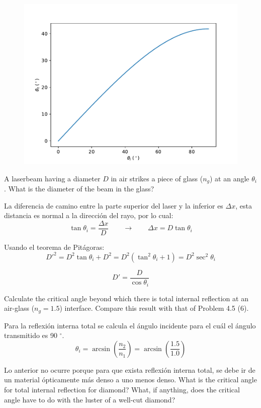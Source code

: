 \documentclass[addpoints,10pt]{exam}
\begin{document}
\begin{questions}
		\begin{figure}[h]
			\centering
			\includegraphics[width = 0.6\linewidth]{418.pdf}
		\end{figure}
		
		{	\question
			A laserbeam having a diameter $D$ in air strikes a piece of glass ($n_{g}$) at an angle $\theta_i$. What is the diameter of the beam in the glass?
		}
		
		La diferencia de camino entre la parte superior del laser y la inferior es $\Delta x$, esta distancia es normal a la direcci\'on del rayo, por lo cual:
		\begin{equation}
			\tan\theta_i = \dfrac{\Delta x}{D} \qquad \longrightarrow \qquad \Delta x = D\tan\theta_i
		\end{equation}
		
		Usando el teorema de Pit\'agoras:
		\begin{equation}
			D'^2 = D^2\tan\theta_i + D^2 = D^2\left(\tan^2\theta_i + 1\right) = D^2\sec^2\theta_i
		\end{equation}
		
		\begin{equation}
			D' = \dfrac{D}{\cos\theta_i}
		\end{equation}
		
		{
			\question
			Calculate the critical angle beyond which there is total internal reflection at an air-glass ($n_g = 1.5$) interface. Compare this result with that of Problem 4.5 (6).
		}
		
		Para la reflexi\'on interna total se calcula el \'angulo incidente para el cu\'al el \'angulo transmitido es 90 $^\circ$.
		\begin{equation}
			\theta_i =  \arcsin\left(\dfrac{n_2}{n_1}\right) = \arcsin\left(\dfrac{1.5}{1.0}\right)
		\end{equation}
		
		Lo anterior no ocurre porque para que exista reflexi\'on interna total, se debe ir de un material \'opticamente m\'as denso a uno menos denso.
		{
			\question
			What is the critical angle for total internal reflection for diamond? What, if anything, does the critical angle have to do with the luster of a well-cut diamond?
		}
		

\end{questions}
\end{document}
